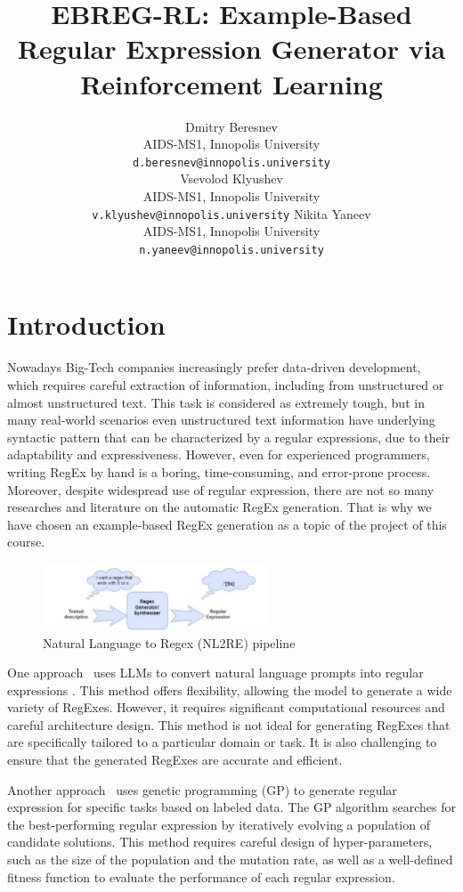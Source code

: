 \documentclass{article}
\title{EBREG-RL: Example-Based Regular Expression Generator
via Reinforcement Learning}
\date{} 					%
\author{
  \hspace{1mm}Dmitry Beresnev\\
	AIDS-MS1, Innopolis University\\
	\texttt{d.beresnev@innopolis.university}\\
	\And{}
  \hspace{1mm}Vsevolod Klyushev\\
	AIDS-MS1, Innopolis University\\
	\texttt{v.klyushev@innopolis.university}	\And{}
  \hspace{1mm}Nikita Yaneev\\
	AIDS-MS1, Innopolis University\\
	\texttt{n.yaneev@innopolis.university}
}
\begin{document}
\maketitle


\section{Introduction}

Nowadays Big-Tech companies increasingly prefer data-driven development, which requires careful extraction of
information, including from unstructured or almost unstructured text. This task is considered as extremely tough,
but in many real-world scenarios even unstructured text information have underlying syntactic pattern that can be
characterized by a regular expressions, due to their adaptability and expressiveness.
However, even for experienced programmers, writing RegEx by hand is a boring, time-consuming, and error-prone
process. Moreover, despite widespread use of regular expression, there are not so many researches and literature on
the automatic RegEx generation. That is why we have chosen an example-based RegEx generation as a topic of the project of
this course.

\begin{figure}[H]
  \centering
  \includegraphics[width=0.6\textwidth]{./pictures/approach1.png}
  \caption{Natural Language to Regex (NL2RE) pipeline}\label{fig:NL2RE}
\end{figure}

One approach~\cite{Zhong2018, Tariq2024} uses LLMs to convert natural language prompts into regular expressions .
This method offers flexibility, allowing the model to generate a wide variety of RegExes.
However, it requires significant computational resources and careful architecture design.
This method is not ideal for generating RegExes that are specifically tailored to a particular domain or task.
It is also challenging to ensure that the generated RegExes are accurate and efficient.

Another approach~\cite{Bartoli2016, Bartoli2018} uses genetic programming (GP) to generate regular expression for specific tasks based on labeled
data. The GP algorithm searches for the best-performing regular expression by iteratively evolving a population of
candidate solutions. This method requires careful design of hyper-parameters, such as the size of the population and
the mutation rate, as well as a well-defined fitness function to evaluate the performance of each regular expression.
\end{document}
